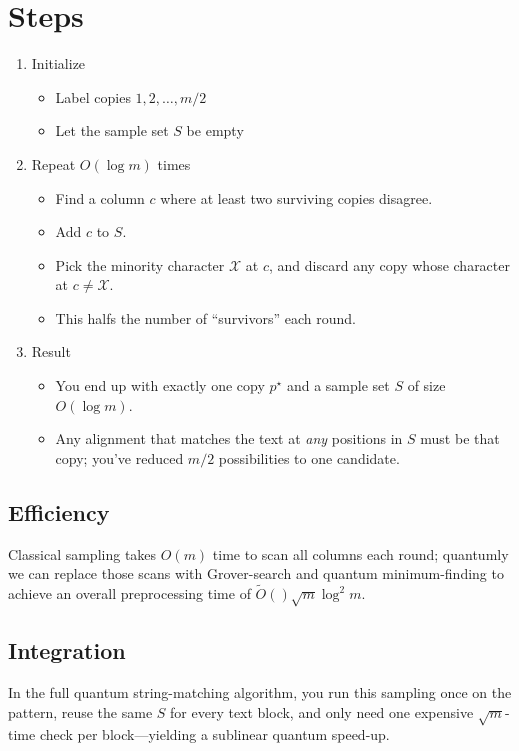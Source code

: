 \documentclass[11pt]{article}
\begin{document}
\section*{Steps}
\begin{enumerate}
  \item Initialize \begin{itemize}
          \item Label copies \(1, 2, \dots, m/2\)
          \item Let the sample set \(S\) be empty
        \end{itemize}
  \item Repeat \(O(\log m)\) times \begin{itemize}
          \item Find a column \(c\) where at least two surviving copies disagree.
          \item Add \(c\) to \(S\).
          \item Pick the minority character \(\mathcal{X}\) at \(c\), and discard any copy whose character at \(c \neq \mathcal{X}\).
          \item This halfs the number of ``survivors'' each round.
        \end{itemize}
  \item Result \begin{itemize}
          \item You end up with exactly one copy \(p^\star\) and a sample set \(S\) of size \(O(\log m)\).
          \item Any alignment that matches the text at \textit{any} positions in \(S\) must be that copy; you've reduced \(m/2\) possibilities to one candidate.
        \end{itemize}
\end{enumerate}

\subsection*{Efficiency}
Classical sampling takes \(O(m)\) time to scan all columns each round; quantumly we can replace those scans with Grover-search and quantum minimum-finding to achieve an overall preprocessing time of \(\widetilde{O}()\sqrt{m} \log^2 m\).

\subsection*{Integration}
In the full quantum string-matching algorithm, you run this sampling once on the pattern, reuse the same \(S\) for every text block, and only need one expensive \(\sqrt{m}\)-time check per block—yielding a sublinear quantum speed-up.
\end{document}
